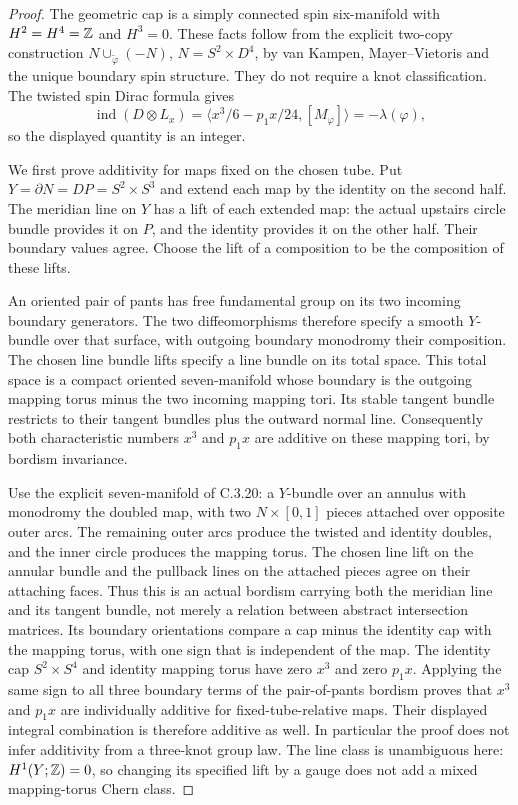 \begin{proof}
The geometric cap is a simply connected spin six-manifold with
$H^2=H^4=\mathbb Z$ and $H^3=0$. These facts follow from the explicit
two-copy construction $N\cup_{\widetilde\varphi}(-N)$,
$N=S^2\times D^4$, by van Kampen, Mayer--Vietoris and the
unique boundary spin structure. They do not require a knot
classification. The twisted spin Dirac formula gives
\[
 \operatorname{ind}(D\otimes L_x)
 =\langle x^3/6-p_1x/24,[M_\varphi]\rangle
 =-\lambda(\varphi),
\]
so the displayed quantity is an integer.

We first prove additivity for maps fixed on the chosen tube.
Put $Y=\partial N=DP=S^2\times S^3$ and extend each map by
the identity on the second half. The meridian line on $Y$ has
a lift of each extended map: the actual upstairs circle bundle
provides it on $P$, and the identity provides it on the other
half. Their boundary values agree. Choose the lift of a
composition to be the composition of these lifts.

An oriented pair of pants has free fundamental group on its
two incoming boundary generators. The two diffeomorphisms
therefore specify a smooth $Y$-bundle over that surface, with
outgoing boundary monodromy their composition. The chosen line
bundle lifts specify a line bundle on its total space. This
total space is a compact oriented seven-manifold whose boundary
is the outgoing mapping torus minus the two incoming mapping
tori. Its stable tangent bundle restricts to their tangent
bundles plus the outward normal line. Consequently both
characteristic numbers $x^3$ and $p_1x$ are additive on these
mapping tori, by bordism invariance.

Use the explicit seven-manifold of C.3.20: a $Y$-bundle over
an annulus with monodromy the doubled map, with two
$N\times[0,1]$ pieces attached over opposite outer arcs.
The remaining outer arcs produce the twisted and identity
doubles, and the inner circle produces the mapping torus.
The chosen line lift on the annular bundle and the pullback
lines on the attached pieces agree on their attaching faces.
Thus this is an actual bordism carrying both the meridian line
and its tangent bundle, not merely a relation between abstract
intersection matrices. Its boundary orientations compare a cap
minus the identity cap with the mapping torus, with one sign
that is independent of the map. The identity cap
$S^2\times S^4$ and identity mapping torus have zero $x^3$
and zero $p_1x$. Applying the same sign to all three boundary
terms of the pair-of-pants bordism proves that $x^3$ and $p_1x$
are individually additive for fixed-tube-relative maps. Their
displayed integral combination is therefore additive as well.
In particular the proof does not infer additivity from a
three-knot group law. The line class is unambiguous here:
$H^1(Y;\mathbb Z)=0$, so changing its specified lift by a gauge does
not add a mixed mapping-torus Chern class.


\end{proof}
